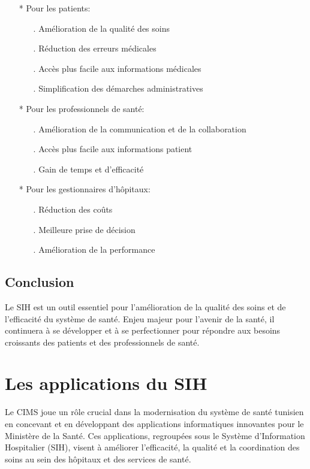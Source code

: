 \documentclass[12pt]{rapportINPTCLOUD}
\begin{document}
	\begin{itemize}
		
		\item[*]  Pour les patients:
		
		\begin{itemize}
			\item[.] 		Amélioration de la qualité des soins
			\item[.] 		Réduction des erreurs médicales
			\item[.] 		Accès plus facile aux informations médicales
			\item[.] 		Simplification des démarches administratives
		\end{itemize}
		
		\item[*] Pour les professionnels de santé:
		
		\begin{itemize}
			\item[.] 		Amélioration de la communication et de la collaboration
			\item[.] 		Accès plus facile aux informations patient
			\item[.] 		Gain de temps et d'efficacité
		\end{itemize}
		
		\item[*] Pour les gestionnaires d'hôpitaux:
		
		\begin{itemize}
			\item[.] 		Réduction des coûts
			\item[.] 		Meilleure prise de décision
			\item[.] 		Amélioration de la performance
		\end{itemize}
		
	\end{itemize}
	
	\section{Conclusion}
	
	Le SIH est un outil essentiel pour l'amélioration de la qualité des soins et de l'efficacité du système de santé. Enjeu majeur pour l'avenir de la santé, il continuera à se développer et à se perfectionner pour répondre aux besoins croissants des patients et des professionnels de santé.
	\chapter{\textcolor{chapitrecolor}{Les applications du SIH}}
	Le CIMS joue un rôle crucial dans la modernisation du système de santé tunisien en concevant et en développant des applications informatiques innovantes pour le Ministère de la Santé. Ces applications, regroupées sous le Système d'Information Hospitalier (SIH), visent à améliorer l'efficacité, la qualité et la coordination des soins au sein des hôpitaux et des services de santé.
	
\end{document}
